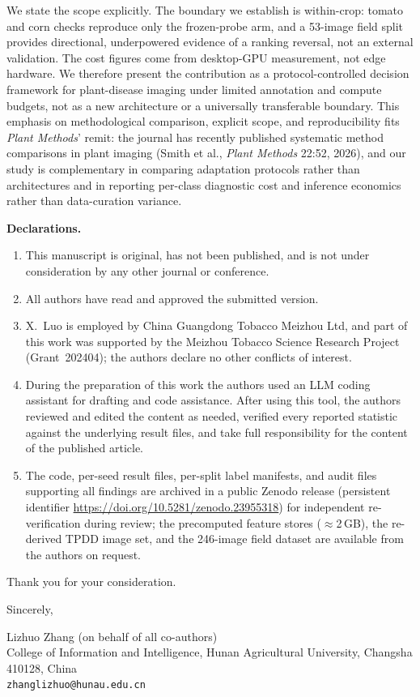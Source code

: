 \documentclass[10pt,a4paper]{article}
\begin{document}
We state the scope explicitly. The boundary we establish is within-crop: tomato and corn checks reproduce only the frozen-probe arm, and a 53-image field split provides directional, underpowered evidence of a ranking reversal, not an external validation. The cost figures come from desktop-GPU measurement, not edge hardware. We therefore present the contribution as a protocol-controlled decision framework for plant-disease imaging under limited annotation and compute budgets, not as a new architecture or a universally transferable boundary. This emphasis on methodological comparison, explicit scope, and reproducibility fits \emph{Plant Methods}' remit: the journal has recently published systematic method comparisons in plant imaging (Smith et al., \emph{Plant Methods} 22:52, 2026), and our study is complementary in comparing adaptation protocols rather than architectures and in reporting per-class diagnostic cost and inference economics rather than data-curation variance.

\noindent\textbf{Declarations.}
\begin{enumerate}
\item This manuscript is original, has not been published, and is not under consideration by any other journal or conference.
\item All authors have read and approved the submitted version.
\item X.~Luo is employed by China Guangdong Tobacco Meizhou Ltd, and part of this work was supported by the Meizhou Tobacco Science Research Project (Grant~202404); the authors declare no other conflicts of interest.
\item During the preparation of this work the authors used an LLM coding assistant for drafting and code assistance. After using this tool, the authors reviewed and edited the content as needed, verified every reported statistic against the underlying result files, and take full responsibility for the content of the published article.
\item The code, per-seed result files, per-split label manifests, and audit files supporting all findings are archived in a public Zenodo release (persistent identifier \url{https://doi.org/10.5281/zenodo.23955318}) for independent re-verification during review; the precomputed feature stores ($\approx$2\,GB), the re-derived TPDD image set, and the 246-image field dataset are available from the authors on request.
\end{enumerate}

Thank you for your consideration.

Sincerely,

Lizhuo Zhang (on behalf of all co-authors)\\
College of Information and Intelligence, Hunan Agricultural University, Changsha 410128, China\\
\texttt{zhanglizhuo@hunau.edu.cn}
\end{document}
